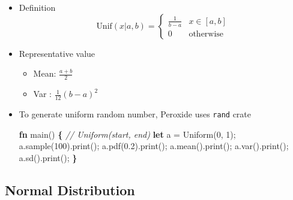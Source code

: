 \documentclass[]{book}
\newenvironment{Shaded}{\begin{snugshade}}{\end{snugshade}}
\newcommand{\CommentTok}[1]{\textcolor[rgb]{0.56,0.35,0.01}{\textit{#1}}}
\newcommand{\DecValTok}[1]{\textcolor[rgb]{0.00,0.00,0.81}{#1}}
\newcommand{\KeywordTok}[1]{\textcolor[rgb]{0.13,0.29,0.53}{\textbf{#1}}}
\newcommand{\NormalTok}[1]{#1}
\newcommand{\OperatorTok}[1]{\textcolor[rgb]{0.81,0.36,0.00}{\textbf{#1}}}
\providecommand{\tightlist}{%
  \setlength{\itemsep}{0pt}\setlength{\parskip}{0pt}}
\begin{document}
\begin{itemize}
\item
  Definition
  \[\text{Unif}(x | a, b) = \begin{cases}
     \frac{1}{b - a} & x \in [a,b]\\
     0 & \text{otherwise}
    \end{cases}\]
\item
  Representative value

  \begin{itemize}
  \tightlist
  \item
    Mean: \(\frac{a + b}{2}\)
  \item
    Var : \(\frac{1}{12}(b-a)^2\)
  \end{itemize}
\item
  To generate uniform random number, Peroxide uses \texttt{rand} crate

\begin{Shaded}
\begin{Highlighting}[]
\KeywordTok{fn}\NormalTok{ main() }\OperatorTok{\{}
    \CommentTok{// Uniform(start, end)}
    \KeywordTok{let}\NormalTok{ a = Uniform(}\DecValTok{0}\NormalTok{, }\DecValTok{1}\NormalTok{);}
\NormalTok{    a.sample(}\DecValTok{100}\NormalTok{).print();}
\NormalTok{    a.pdf(}\DecValTok{0.2}\NormalTok{).print();}
\NormalTok{    a.mean().print();}
\NormalTok{    a.var().print();}
\NormalTok{    a.sd().print();}
\OperatorTok{\}}
\end{Highlighting}
\end{Shaded}
\end{itemize}

\hypertarget{normal-distribution}{%
\subsection{Normal Distribution}\label{normal-distribution}}
\end{document}
